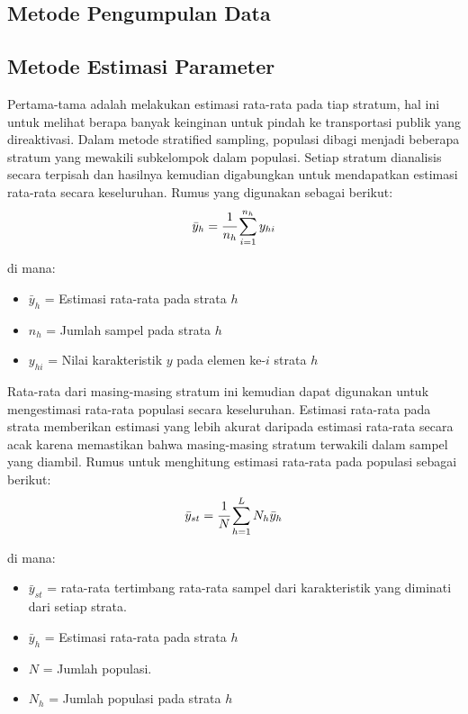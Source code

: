 \documentclass{article}
\begin{document}
\subsection{Metode Pengumpulan Data}

\subsection{Metode Estimasi Parameter}

Pertama-tama adalah melakukan estimasi rata-rata pada tiap stratum, hal ini untuk melihat berapa banyak keinginan untuk pindah ke transportasi publik yang direaktivasi. Dalam metode stratified sampling, populasi dibagi menjadi beberapa stratum yang mewakili subkelompok dalam populasi. Setiap stratum dianalisis secara terpisah dan hasilnya kemudian digabungkan untuk mendapatkan estimasi rata-rata secara keseluruhan. Rumus yang digunakan sebagai berikut:
\begin{align}
    \bar{y}_{h} = \cfrac{1}{n_{h}} \sum_{i=1}^{n_{h}} y_{hi}
\end{align} 

di mana:
\begin{itemize}
    \item $\bar{y}_{h}$ = Estimasi rata-rata pada strata $h$
    \item $n_{h}$ = Jumlah sampel pada strata $h$
    \item $y_{hi}$ = Nilai karakteristik $y$ pada elemen ke-$i$ strata $h$
\end{itemize}

Rata-rata dari masing-masing stratum ini kemudian dapat digunakan untuk mengestimasi rata-rata populasi secara keseluruhan. Estimasi rata-rata pada strata memberikan estimasi yang lebih akurat daripada estimasi rata-rata secara acak karena memastikan bahwa masing-masing stratum terwakili dalam sampel yang diambil. Rumus untuk menghitung estimasi rata-rata pada populasi sebagai berikut:
\begin{align}
    \bar{y}_{st} = \cfrac{1}{N} \sum_{h=1}^{L} N_{h} \bar{y}_{h}
\end{align}

di mana:
\begin{itemize}
    \item $\bar{y}_{st}$ = rata-rata tertimbang rata-rata sampel dari karakteristik yang diminati dari setiap strata.
    \item $\bar{y}_{h}$ = Estimasi rata-rata pada strata $h$
    \item $N$ = Jumlah populasi.
    \item $N_{h}$ = Jumlah populasi pada strata $h$
\end{itemize}
\end{document}
